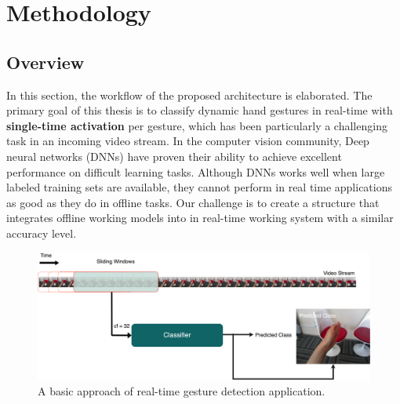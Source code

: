 \chapter{Methodology}
\label{ch:methodology}

\section{Overview}
\label{sec:overview}
In this section, the workflow of the proposed architecture is elaborated.  The primary goal of this thesis is to classify dynamic hand gestures in real-time with \textbf{single-time activation} per gesture, which has been particularly a challenging task in an incoming video stream. In the computer vision community,  Deep neural networks (DNNs) have proven their ability to achieve excellent performance on difficult learning tasks.    Although  DNNs works well when large labeled training sets are available, they cannot perform in real time applications as good as they do in offline tasks.  Our challenge is to create a structure that integrates offline working models into in real-time working system with a similar accuracy level.\\
\begin{figure}[h]
	\centering
	\includegraphics[width=1.0\linewidth]{figures/old_workflow}
	\caption{A basic approach of real-time gesture detection application.}
	\label{fig:old_workflow}
\end{figure}

